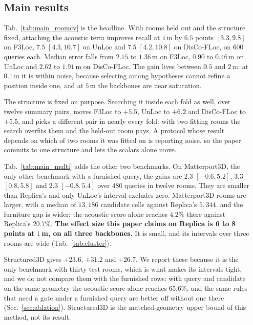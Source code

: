 \subsection{Main results}
\label{sec:main}




Tab.~\ref{tab:main_roomcv} is the headline. With rooms held out and the
structure fixed, attaching the acoustic term improves recall at $1$\,m by
$6.5$ points $[3.3, 9.8]$ on F3Loc, $7.5$ $[4.3, 10.7]$ on UnLoc and
$7.5$ $[4.2, 10.8]$ on DisCo-FLoc, on $600$ queries each.
Median error falls from $2.15$ to $1.36$\,m on F3Loc, $0.90$ to $0.46$\,m on
UnLoc and $2.62$ to $1.91$\,m on DisCo-FLoc. The gain lives between $0.5$ and $2$\,m: at $0.1$\,m it is within
noise, because selecting among hypotheses cannot refine a position inside one,
and at $5$\,m the backbones are near saturation.

The structure is fixed on purpose. Searching it inside each fold as well, over
twelve summary pairs, moves F3Loc to $+5.5$, UnLoc to $+6.2$ and DisCo-FLoc to
$+5.5$, and picks a different pair in nearly every fold: with two fitting rooms
the search overfits them and the held-out room pays. A protocol whose result
depends on which of two rooms it was fitted on is reporting noise, so the
paper commits to one structure and lets the scalars alone move.

Tab.~\ref{tab:main_multi} adds the other two benchmarks. On Matterport3D, the
only other benchmark with a furnished query, the gains are $2.3$ $[-0.6, 5.2]$,
$3.3$ $[0.8, 5.8]$ and $2.3$ $[-0.8, 5.4]$ over $480$ queries in twelve rooms.
They are smaller than Replica's and only UnLoc's interval excludes zero.
Matterport3D rooms are larger, with a median of $13{,}186$ candidate cells
against Replica's $5{,}344$, and the furniture gap is wider: the acoustic score
alone reaches $4.2\%$ there against Replica's $20.7\%$. \textbf{The effect size
this paper claims on Replica is 6 to 8 points at $1$\,m, on all three
backbones.} It is small, and its intervals over three rooms are wide
(Tab.~\ref{tab:cluster}).

Structured3D gives $+23.6$, $+31.2$ and $+26.7$. We report these because it is
the only benchmark with thirty test rooms, which is what makes its intervals
tight, and we do not compare them with the furnished rows: with query and
candidate on the same geometry the acoustic score alone reaches $65.6\%$, and
the same rules that need a gate under a furnished query are better off without
one there (Sec.~\ref{sec:ablation}). Structured3D is the matched-geometry upper
bound of this method, not its result.

